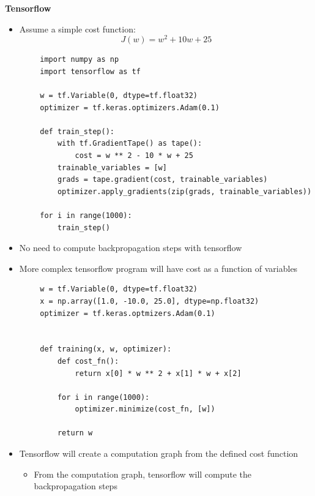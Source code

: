 \documentclass[12pt, letterpaper]{article}
\begin{document}
    \vspace{5mm}
    \textbf{Tensorflow}
    \begin{itemize}
        \item Assume a simple cost function:
        $$J(w)=w^2+10w+25$$
    \end{itemize}
    \begin{verbatim}
        import numpy as np 
        import tensorflow as tf

        w = tf.Variable(0, dtype=tf.float32)
        optimizer = tf.keras.optimizers.Adam(0.1)

        def train_step():
            with tf.GradientTape() as tape():
                cost = w ** 2 - 10 * w + 25
            trainable_variables = [w]
            grads = tape.gradient(cost, trainable_variables)
            optimizer.apply_gradients(zip(grads, trainable_variables))

        for i in range(1000):
            train_step() 
    \end{verbatim}
    \begin{itemize}
        \item No need to compute backpropagation steps with tensorflow
        \item More complex tensorflow program will have cost as a function of variables
    \end{itemize}
    \begin{verbatim}
        w = tf.Variable(0, dtype=tf.float32)
        x = np.array([1.0, -10.0, 25.0], dtype=np.float32)
        optimizer = tf.keras.optmizers.Adam(0.1)


        def training(x, w, optimizer):
            def cost_fn():
                return x[0] * w ** 2 + x[1] * w + x[2]

            for i in range(1000):
                optimizer.minimize(cost_fn, [w])

            return w  
    \end{verbatim}
    \begin{itemize}
        \item Tensorflow will create a computation graph from the defined cost function
        \begin{itemize}
            \item From the computation graph, tensorflow will compute the backpropagation steps
        \end{itemize} 
    \end{itemize}
    \pagebreak
    
\end{document}
